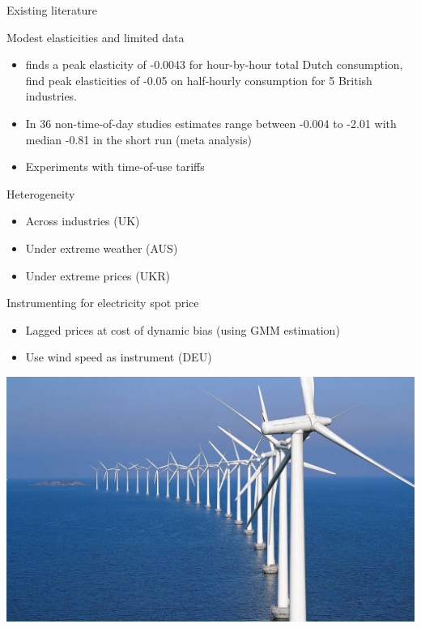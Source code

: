 \begin{frame}{Existing literature}
\begin{multicols}{2}
Modest elasticities and limited data
\begin{itemize}
    \item \citet{lijesen2007real} finds a peak elasticity of -0.0043 for hour-by-hour total Dutch consumption, \citet{wolak2001impact} find peak elasticities of -0.05 on half-hourly consumption for 5 British industries.
    \item In 36 non-time-of-day studies estimates range between -0.004 to -2.01 with median -0.81 in the short run (meta analysis)
    \item Experiments with time-of-use tariffs
\end{itemize}
\columnbreak
Heterogeneity
\begin{itemize}
    \item Across industries (UK)
    \item Under extreme weather (AUS)
    \item Under extreme prices (UKR)
\end{itemize}
Instrumenting for electricity spot price
\begin{itemize}
    \item Lagged prices at cost of dynamic bias (using GMM estimation)
    \item Use wind speed as instrument (DEU)
\end{itemize}
\end{multicols}
\includegraphics[width=1 \textwidth]{graphics/wind_mills}
\end{frame}


